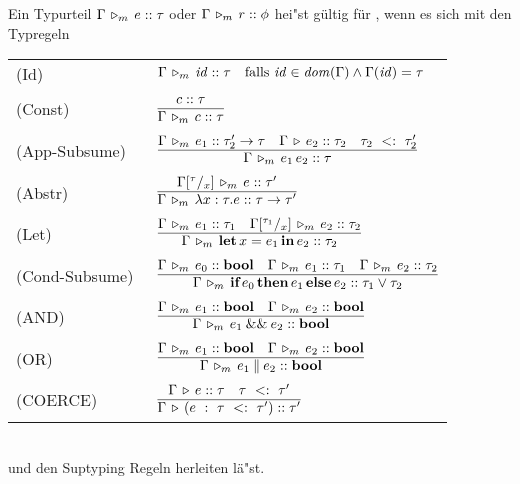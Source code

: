   Ein Typurteil $\Gamma\,\triangleright_m\,e\mathrel{::}\tau$ oder $\Gamma\,\triangleright_m\,r\mathrel{::}\phi$ hei"st g\"ultig f\"ur \Lom,
  wenn es sich mit den Typregeln  \\[5mm]
  \begin{tabular}{ll} 
    \mbox{(Id)\ }           & $\Gamma\,\triangleright_m\,{\text{\it id\/}}\mathrel{::}\tau \quad \text{falls } {\text{\it id\/}}\in{\text{\it dom\/}}(\Gamma) \wedge \Gamma({\text{\it id\/}}) = \tau$ \\[1mm]
    \mbox{(Const)\ }        & $\RULE{\tj{c}{\tau}}
                              {\Tjm{\Gamma}{c}{\tau}}$ \\[4mm]
    \mbox{(App-Subsume)\ }  & $\RULE{\Tjm{\Gamma}{e_1}{\typeArrow{\tau_2'}{\tau}}
                               \quad
                               \Tj{\Gamma}{e_2}{\tau_2}
                               \quad
                               \subtype{\tau_2} {\tau_2'}}
                              {\Tjm{\Gamma}{\expApp{e_1}{e_2}}{\tau}}$ \\[4mm]
    \mbox{(Abstr)\ }        & $\RULE{\Tjm{\Gamma\SUB{\tau}{x}}{e}{\tau'}}
                              {\Tjm{\Gamma}{\expAbstr{x:\tau}{e}}{\typeArrow{\tau}{\tau'}}}$ \\[4mm]
    \mbox{(Let)\ }          & $\RULE{\Tjm{\Gamma}{e_1}{\tau_1}
                               \quad
                               \Tjm{\Gamma\SUB{\tau_1}{x}}{e_2}{\tau_2}}
                              {\Tjm{\Gamma}{\expLet{x}{e_1}{e_2}}{\tau_2}}$ \\[4mm]
   \mbox{(Cond-Subsume)\ } & $\RULE{\Tjm{\Gamma}{e_0}{\bool}
                               \quad
                               \Tjm{\Gamma}{e_1}{\tau_1}
                               \quad
                               \Tjm{\Gamma}{e_2}{\tau_2}}
                              {\Tjm{\Gamma}{\expCond{e_0}{e_1}{e_2}}{\tau_1 \vee \tau_2}}$ \\[4mm]
  \mbox{(AND)\ } & $\regel{\Tjm{\Gamma}{e_1}{\bool} \quad \Tjm{\Gamma}{e_2}{\bool}}
                          {\Tjm{\Gamma}{\andalso{e_1}{e_2}}{\bool}}$ \\[4mm]
  \mbox{(OR)\  } & $\regel{\Tjm{\Gamma}{e_1}{\bool} \quad \Tjm{\Gamma}{e_2}{\bool}}
                          {\Tjm{\Gamma}{\orelse{e_1}{e_2}}{\bool}}$\\[4mm]
   \mbox{(COERCE)\ } & $\regel{\Tj{\Gamma}{e}{\tau} \quad \subtype{\tau}{\tau'}} 
                          {\Tj{\Gamma}{\coercion{e}{\tau}{\tau'}}{\tau'}}$
   
  \end{tabular} \\[7mm]
  und den Suptyping Regeln herleiten l\"a"st.



